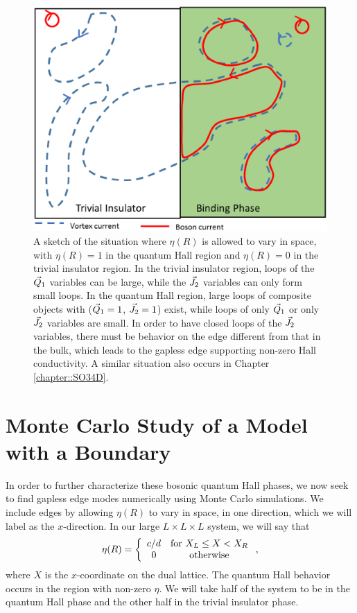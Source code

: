 \begin{figure}
\includegraphics[width=\linewidth]{figures/surface.eps}
\caption{A sketch of the situation where $\eta(R)$ is allowed to vary in space, with $\eta(R)=1$ in the quantum Hall region and $\eta(R)=0$ in the trivial insulator region. In the trivial insulator region, loops of the $\vec{Q}_1$ variables can be large, while the $\vec{J}_2$ variables can only form small loops. In the quantum Hall region, large loops of composite objects with ($\vec{Q}_1=1$, $\vec{J}_2=1$) exist, while loops of only $\vec{Q}_1$ or only $\vec{J}_2$ variables are small. In order to have closed loops of the $\vec{J}_2$ variables, there must be behavior on the edge different from that in the bulk, which leads to the gapless edge supporting non-zero Hall conductivity. A similar situation also occurs in Chapter \ref{chapter::SO34D}.
\label{surface}}
\end{figure}

\section{Monte Carlo Study of a Model with a Boundary}
\label{sec:reform}
In order to further characterize these bosonic quantum Hall phases, we now seek to find gapless edge modes numerically using Monte Carlo simulations.\cite{Senthil_Ashvin_thanks}  We include edges by allowing $\eta(R)$ to vary in space, in one direction, which we will label as the $x$-direction. In our large $L\times L\times L$ system, we will say that 
\begin{equation}
\eta(R)=\left\{\begin{array}{cc}
c/d & {\rm for}~ X_L \leq X < X_R \\
0 & {\rm otherwise}
\end{array}\right. ,
\label{etaspace}
\end{equation}
where $X$ is the $x$-coordinate on the dual lattice. The quantum Hall behavior occurs in the region with non-zero $\eta$. 
We will take half of the system to be in the quantum Hall phase and the other half in the trivial insulator phase.

